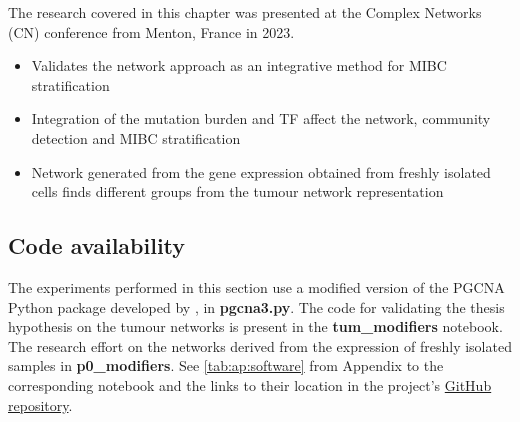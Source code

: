 The research covered in this chapter was presented at the Complex Networks (CN) conference from Menton, France in 2023.

\begin{itemize}
    \item Validates the network approach as an integrative method for MIBC stratification
     \item Integration of the mutation burden and TF affect the network, community detection and MIBC stratification
     \item Network generated from the gene expression obtained from freshly isolated cells finds different groups from the tumour network representation
\end{itemize}

\subsection{Code availability} \label{s:N_I:implementation}

The experiments performed in this section use a modified version of the PGCNA Python package developed by \citep{Care2019-ij}, in \textbf{pgcna3.py}. The code for validating the thesis hypothesis on the tumour networks is present in the \textbf{tum\_modifiers} notebook. The research effort on the networks derived from the expression of freshly isolated samples in \textbf{p0\_modifiers}. See \cref{tab:ap:software} from Appendix to the corresponding notebook and the links to their location in the project's \href{https://github.com/vladUng/PhD_thesis_exp/}{GitHub repository}.